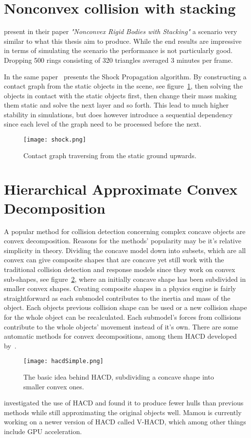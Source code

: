 \section{Nonconvex collision with stacking}
\cite{guendelman} present in their paper \textit{"Nonconvex Rigid Bodies with Stacking"}
a scenario very similar to what this thesis aim to produce.
While the end results are impressive in terms of simulating the scenario the performance
is not particularly good. Dropping 500 rings consisting of 320 triangles averaged 3 minutes per frame.

In the same paper~\cite{guendelman} presents the Shock Propagation algorithm.
By constructing a contact graph from the static objects in the scene, see figure~\ref{fig:cont},
then solving the objects in contact with the static objects first, then change their
mass making them static and solve the next layer and so forth. This lead to much
higher stability in simulations, but does however introduce a sequential dependency
since each level of the graph need to be processed before the next.

\begin{figure}[H]
  \centering
  \texttt{[image: shock.png]}
  \caption{Contact graph traversing from the static ground upwards.}
  \label{fig:cont}
\end{figure}

\section{Hierarchical Approximate Convex Decomposition}
A popular method for collision detection concerning complex concave objects
are convex decomposition. Reasons for the methods' popularity may be it's relative
simplicity in theory. Dividing the concave model down into subsets, which are
all convex can give composite shapes that are concave yet still work with the
traditional collision detection and response models since they work on convex
sub-shapes, see figure~\ref{fig:hacdSimple}, where an initially concave shape has
been subdivided in smaller convex shapes. Creating composite shapes in a physics
engine is fairly straightforward as each submodel contributes to the inertia and
mass of the object. Each objects previous collision shape can be used or a new collision
shape for the whole object can be recalculated. Each submodel's forces from collisions
contribute to the whole objects' movement instead of it's own.
There are some automatic methods for convex decompositions, among them HACD developed by~\cite{mamou}.

\begin{figure}[H]
  \centering
  \texttt{[image: hacdSimple.png]}
  \caption{The basic idea behind HACD, subdividing a concave shape into smaller convex ones.}
  \label{fig:hacdSimple}
\end{figure}

\cite{HACD} investigated the use of HACD and found it to produce fewer hulls
than previous methods while still approximating the original objects well.
Mamou is currently working on a newer version of HACD called
V-HACD, which among other things include GPU acceleration.
